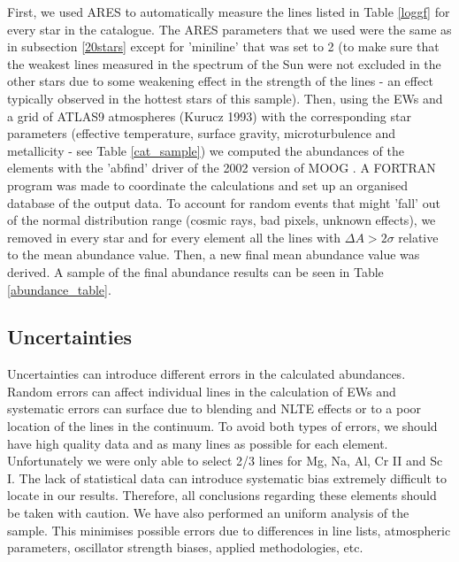 \documentclass[dvips,12pt,a4paper]{report}
\begin{document}
{{First, we used ARES to automatically measure the lines listed in Table \ref{loggf} for every star in the catalogue. The ARES parameters that we used were the same as in subsection \ref{20stars} except for 'miniline' that was set to 2 (to make sure that the weakest lines measured in the spectrum of the Sun were not excluded in the other stars due to some weakening effect in the strength of the lines - an effect typically observed in the hottest stars of this sample). Then, using the EWs and a grid of ATLAS9 atmospheres (Kurucz 1993) with the corresponding star parameters (effective temperature, surface gravity, microturbulence and metallicity - see Table \ref{cat_sample}) we computed the abundances of the elements with the 'abfind' driver of the 2002 version of MOOG \citep{Sneden-1973}. A FORTRAN program was made to coordinate the calculations and set up an organised database of the output data. To account for random events that might 'fall' out of the normal distribution range (cosmic rays, bad pixels, unknown effects), we removed in every star and for every element all the lines with $\Delta A>2\sigma$ relative to the mean abundance value. Then, a new final mean abundance value was derived. A sample of the final abundance results can be seen in Table \ref{abundance_table}. 

\subsection {Uncertainties}
\label{uncertain}
Uncertainties can introduce different errors in the calculated abundances. Random errors can affect individual lines in the calculation of EWs and systematic errors can surface due to blending and NLTE effects or to a poor location of the lines in the continuum. To avoid both types of errors, we should have high quality data and as many lines as possible for each element. Unfortunately we were only able to select 2/3 lines for Mg, Na, Al, Cr II and Sc I. The lack of statistical data can introduce systematic bias extremely difficult to locate in our results. Therefore, all conclusions regarding these elements should be taken with caution. We have also performed an uniform analysis of the sample. This minimises possible errors due to differences in line lists, atmospheric parameters, oscillator strength biases, applied methodologies, etc. 

}}
\end{document}
